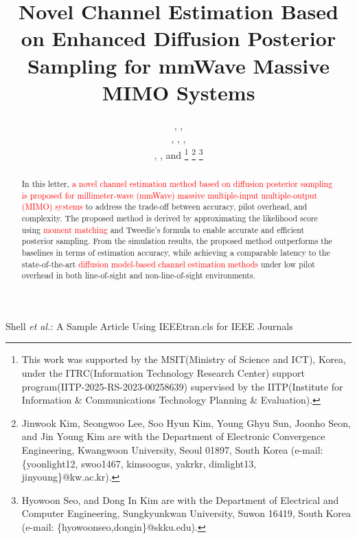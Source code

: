 \documentclass[lettersize,journal]{IEEEtran}
\newcommand{\tred}{\textcolor{red}}
\begin{document}
\title{Novel Channel Estimation Based on Enhanced Diffusion Posterior Sampling for mmWave Massive MIMO Systems}

\author{,  ,

, ,
,

, , and 
\thanks{This work was 
supported by the MSIT(Ministry of Science and ICT), Korea, under the ITRC(Information Technology Research Center) support program(IITP-2025-RS-2023-00258639) supervised by the IITP(Institute for Information \& Communications Technology Planning \& Evaluation).}%
\thanks{Jinwook Kim, Seongwoo Lee, Soo Hyun Kim, Young Ghyu Sun, Joonho Seon, and Jin Young Kim are with the Department of Electronic Convergence Engineering, Kwangwoon University, Seoul 01897, South Korea (e-mail: \{yoonlight12, swoo1467, kimsoogus, yakrkr, dimlight13, jinyoung\}@kw.ac.kr).}
\thanks{Hyowoon Seo, and Dong In Kim are with the Department of Electrical and Computer Engineering, Sungkyunkwan University, Suwon 16419, South Korea (e-mail: \{hyowoonseo,dongin\}@skku.edu).}}


%
{Shell \MakeLowercase{\textit{et al.}}: A Sample Article Using IEEEtran.cls for IEEE Journals}

\maketitle
\begin{abstract}
In this letter, \tred{a novel channel estimation method based on diffusion posterior sampling is proposed for millimeter-wave (mmWave) massive multiple-input multiple-output (MIMO) systems} to address the trade-off between accuracy, pilot overhead, and complexity. The proposed method is derived by approximating the likelihood score using \tred{moment matching} and Tweedie's formula to enable accurate and efficient posterior sampling. From the simulation results, the proposed method outperforms the baselines in terms of estimation accuracy, while achieving a comparable latency to the state-of-the-art \tred{diffusion model-based channel estimation methods} under low pilot overhead in both line-of-sight and non-line-of-sight environments.
\end{abstract}
\end{document}

